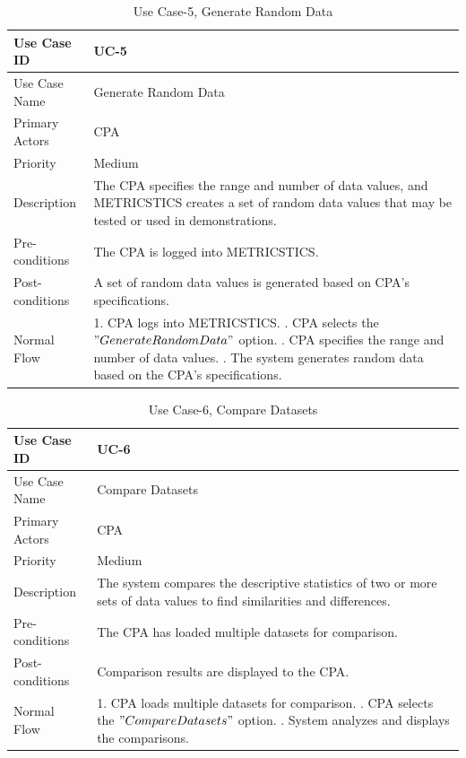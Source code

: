 \begin{table}[H]
\centering
\def\arraystretch{1.5}
\begin{tabular}{|l|p{4.5in}|}
\hline
Use Case ID & UC-5\\ \hline
Use Case Name & Generate Random Data\\ \hline
Primary Actors & CPA\\ \hline
Priority & Medium\\ \hline
Description & The CPA specifies the range and number of data values, and \mbox{METRICSTICS} creates a set of random data values that may be tested or used in demonstrations.\\ \hline
Pre-conditions & The CPA is logged into METRICSTICS.\\ \hline
Post-conditions & A set of random data values is generated based on CPA's specifications.\\ \hline
Normal Flow & 1. CPA logs into METRICSTICS.
     \newline 2. CPA selects the $"Generate Random Data"$ option.
     \newline 3. CPA specifies the range and number of data values.
     \newline 4. The system generates random data based on the CPA's specifications.
    \\ \hline
\end{tabular}
\caption{Use Case-5, Generate Random Data}
\end{table}


\begin{table}[H]
\centering
\def\arraystretch{1.5}
\begin{tabular}{|l|p{4.5in}|}
\hline
Use Case ID & UC-6\\ \hline
Use Case Name & Compare Datasets\\ \hline
Primary Actors & CPA\\ \hline
Priority & Medium\\ \hline
Description & The system compares the descriptive statistics of two or more sets of data values to find similarities and differences.\\ \hline
Pre-conditions & The CPA has loaded multiple datasets for comparison.\\ \hline
Post-conditions & Comparison results are displayed to the CPA.\\ \hline
Normal Flow & 1. CPA loads multiple datasets for comparison.
     \newline 2. CPA selects the $"Compare Datasets"$ option.
     \newline 3. System analyzes and displays the comparisons.
    \\ \hline
\end{tabular}
\caption{Use Case-6, Compare Datasets}
\end{table}


